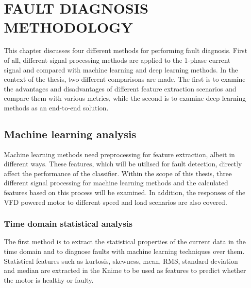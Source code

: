 \chapter{FAULT DIAGNOSIS METHODOLOGY}\label{Ch4}
This chapter discusses four different methods for performing fault diagnosis. First of all, different signal processing methods are applied to the 1-phase current signal and compared with machine learning and deep learning methods. In the context of the thesis, two different comparisons are made. The first is to examine the advantages and disadvantages of different feature extraction scenarios and compare them with various metrics, while the second is to examine deep learning methods as an end-to-end solution.
\section{Machine learning analysis}
Machine learning methods need preprocessing for feature extraction, albeit in different ways. These features, which will be utilised for fault detection, directly affect the performance of the classifier. Within the scope of this thesis, three different signal processing for machine learning methods and the calculated features based on this process will be examined. In addition, the responses of the VFD powered motor to different speed and load scenarios are also covered.
\subsection{Time domain statistical analysis}
The first method is to extract the statistical properties of the current data in the time domain and to diagnose faults with machine learning techniques over them. Statistical features such as kurtosis, skewness, mean, RMS, standard deviation and median are extracted in the Knime to be used as features to predict whether the motor is healthy or faulty. 

